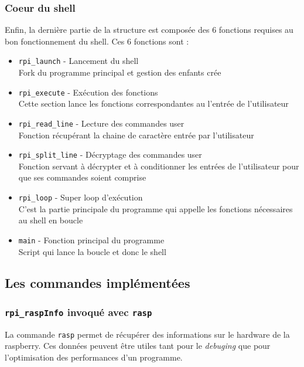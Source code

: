 \documentclass[10pt,a4paper]{article}
\begin{document}
\subsubsection{Coeur du shell}
Enfin, la dernière partie de la structure est composée des 6 fonctions requises au bon fonctionnement du shell. Ces 6 fonctions sont : 
\begin{itemize}
\item \texttt{rpi\_launch} - Lancement du shell\\
Fork du programme principal et gestion des enfants crée

\item \texttt{rpi\_execute} - Exécution des fonctions\\
Cette section lance les fonctions correspondantes au l'entrée de l'utilisateur

\item \texttt{rpi\_read\_line} - Lecture des commandes user\\
Fonction récupérant la chaine de caractère entrée par l'utilisateur

\item \texttt{rpi\_split\_line} - Décryptage des commandes user\\
Fonction servant à décrypter et à conditionner les entrées de l'utilisateur pour que ses commandes soient comprise

\item \texttt{rpi\_loop} - Super loop d'exécution\\
C'est la partie principale du programme qui appelle les fonctions nécessaires au shell en boucle

\item \texttt{main} - Fonction principal du programme\\
Script qui lance la boucle et donc le shell 
\end{itemize}

\subsection{Les commandes implémentées}
\subsubsection{\texttt{rpi\_raspInfo} invoqué avec \texttt{rasp}}
La commande \texttt{rasp} permet de récupérer des informations sur le hardware de la raspberry. Ces données peuvent être utiles tant pour le \textit{debuging} que pour l'optimisation des performances d'un programme.\\
\end{document}
